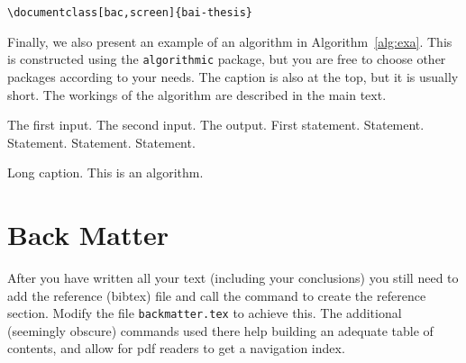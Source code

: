 \verb|\documentclass[bac,screen]{bai-thesis}| \\
\begin{document}
Finally, we also present an example of an algorithm in Algorithm~\ref{alg:exa}.
%
This is constructed using the \texttt{algorithmic} package, but you are free to choose other packages according to your needs. The caption is also at the top, but it is usually short. The workings of the algorithm are described in the main text.
%
\begin{algorithm}[tb]
\begin{algorithmic}[1]
\REQUIRE The first input.
\REQUIRE The second input.
\ENSURE The output.
\medskip
\STATE First statement.
    \STATE Statement.
    \STATE Statement.
  \ELSE
    \STATE Statement.
  \ENDIF
\STATE Statement.
\ENDFOR
\end{algorithmic}
\caption[Short caption for list of algorithms.]
{Long caption.  This is an algorithm.}
\label{alg:exa}
\end{algorithm}

\section{Back Matter}

After you have written all your text (including your conclusions) you
still need to add the reference (bibtex) file and call the command to
create the reference section. Modify the file \texttt{backmatter.tex}
to achieve this. The additional (seemingly obscure) commands used there
help building an adequate table of contents, and allow for pdf readers
to get a navigation index.
\end{document}

